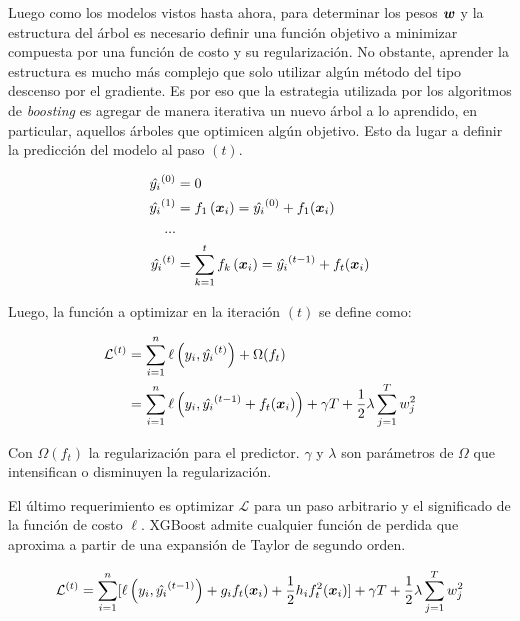 Luego como los modelos vistos hasta ahora, para determinar los pesos $\boldsymbol{w}$
y la estructura del árbol es necesario definir una función objetivo a minimizar
compuesta por una función de costo y su regularización. No obstante, aprender la
estructura es mucho más complejo que solo utilizar algún método del tipo
descenso por el gradiente. Es por eso que la estrategia utilizada por los
algoritmos de \emph{boosting} es agregar de manera iterativa un nuevo árbol a lo
aprendido, en particular, aquellos árboles que optimicen algún objetivo. Esto da
lugar a definir la predicción del modelo al paso $(t)$.

\begin{align*}
    \hat{y_i}^{(0)} &= 0 \\
    \hat{y_i}^{(1)} &= f_{1}\left( \boldsymbol{x}_i \right) = \hat{y_i}^{(0)} + f_1{(\boldsymbol{x}_i)} \\
    ... \\
    \hat{y_i}^{(t)} &= \sum_{k=1}^{t} f_{k} \left( \boldsymbol{x}_{i}\right) = \hat{y_i}^{(t - 1)} + f_t{(\boldsymbol{x}_i)}
\end{align*}

Luego, la función a optimizar en la iteración $(t)$ se define como:

\begin{align}
    \mathcal{L}^{(t)} &= \sum_{i=1}^{n} \ell\left( y_i, \hat{y_i}^{(t)} \right) + \Omega(f_t) \\
                      &= \sum_{i=1}^{n} \ell\left( y_i, \hat{y_i}^{(t - 1)} + f_t{(\boldsymbol{x}_i)} \right) + \gamma T + \frac{1}{2} \lambda \sum_{j=1}^{T} w_{j}^{2}
\end{align}

Con $\Omega(f_t)$ la regularización para el predictor. $\gamma$ y $\lambda$ son parámetros de $\Omega$ que intensifican o disminuyen la regularización.

El último requerimiento es optimizar $\mathcal{L}$ para un paso arbitrario y el
significado de la función de costo $\ell$. XGBoost admite cualquier función de
perdida que aproxima a partir de una expansión de Taylor de segundo orden.

\begin{equation} \label{eq:xgboost-loss-taylor}
    \mathcal{L}^{(t)} = \sum_{i = 1}^{n} [
        \ell\left(y_i,
                  \hat{y_{i}}^{(t-1)}
            \right) +
                g_i f_t(\boldsymbol{x}_i) +
                \frac{1}{2} h_i f_t^{2}(\boldsymbol{x}_i)
        ] + \gamma T + \frac{1}{2} \lambda \sum_{j=1}^{T} w_{j}^{2}
\end{equation}


